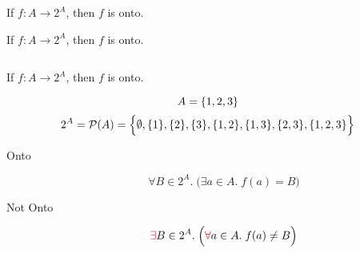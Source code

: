 
\begin{frame}{}
  \begin{theorem}
    If $f: A \to 2^{A}$, then $f$ is  onto.
  \end{theorem}

  \pause
  \vspace{0.60cm}
\end{frame}

\begin{frame}{}
  \begin{theorem}
    If $f: A \to 2^{A}$, then $f$ is  onto.
  \end{theorem}

  \vspace{0.60cm}
  \begin{columns}
      \pause
      \pause
      \pause
    \end{columns}
\end{frame}

\begin{frame}{}
  \begin{theorem}
    If $f: A \to 2^{A}$, then $f$ is  onto.
  \end{theorem}

  \vspace{0.30cm}
  \[
    A = \{1,2,3\}
  \]
  \pause
  \[
    2^{A} = \mathcal{P}(A) = \Big\{\emptyset, \{1\}, \{2\}, \{3\}, \{1,2\}, \{1,3\}, \{2,3\}, \{1,2,3\}\Big\}
  \]

  \pause
  \begin{description}
    \item[Onto]
      \[
        \forall B \in 2^{A}.\; \Big(\exists a \in A.\; f(a) = B\Big)
      \]
    \pause
    \item[Not Onto]
      \[
        \textcolor{red}{\exists} B \in 2^{A}.\; \Big(\textcolor{red}{\forall} a \in A.\; f(a) \neq B\Big)
      \]
  \end{description}
\end{frame}

